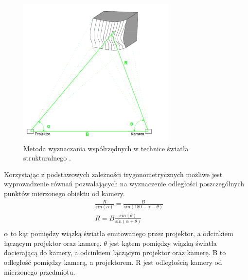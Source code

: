 \begin{figure}[H]
  \centering
  \includegraphics[scale=0.75]{swiatlostrukturalne.PNG}
  \caption{Metoda wyznaczania współrzędnych w technice światła strukturalnego \cite{Wrona_Piotrowska_2015}.}   
  \label{fig:structureLightPic1}
\end{figure}
\newline
Korzystając z podstawowych zależności trygonometrycznych możliwe jest wyprowadzenie równań pozwalających na wyznaczenie odległości poszczególnych punktów mierzonego obiektu od kamery.
\begin{equation}
    \begin{aligned}
        & \frac{R}{sin(\alpha)}=\frac{B}{sin(180-\alpha-\theta)} \\
          & R=B\frac{sin(\theta)}{sin(\alpha+\theta)} \\
    \end{aligned}
\end{equation}
$\alpha$ to kąt pomiędzy wiązką światła emitowanego przez projektor, a odcinkiem łączącym projektor oraz kamerę. $\theta$ jest kątem pomiędzy wiązką światła docierającą do kamery, a odcinkiem łączącym projektor oraz kamerę. B to odległość pomiędzy kamerą, a projektorem. R jest odległością kamery od mierzonego przedmiotu.

